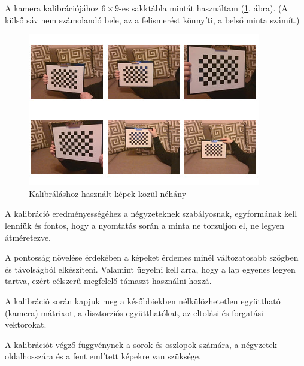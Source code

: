 
A kamera kalibrációjához $6 \times 9$-es sakktábla mintát használtam (\ref{fig:calibration}. ábra). (A külső sáv nem számolandó bele, az a felismerést könnyíti, a belső minta számít.)

\begin{figure}[htp]
	\centering
	\includegraphics[scale=1]{images/calibration.jpg}
	\caption{Kalibráláshoz használt képek közül néhány}
	\label{fig:calibration}
\end{figure}

A kalibráció eredményességéhez a négyzeteknek szabályosnak, egyformának kell lenniük és fontos, hogy a nyomtatás során a minta ne torzuljon el, ne legyen átméretezve.

A pontosság növelése érdekében a képeket érdemes minél változatosabb szögben és távolságból elkészíteni. Valamint ügyelni kell arra, hogy a lap egyenes legyen tartva, ezért célszerű megfelelő támaszt használni hozzá.

A kalibráció során kapjuk meg a későbbiekben nélkülözhetetlen együttható (kamera) mátrixot, a disztorziós együtthatókat, az eltolási és forgatási vektorokat.

A kalibrációt végző függvénynek a sorok és oszlopok számára, a négyzetek oldalhosszára és a fent említett képekre van szüksége.

